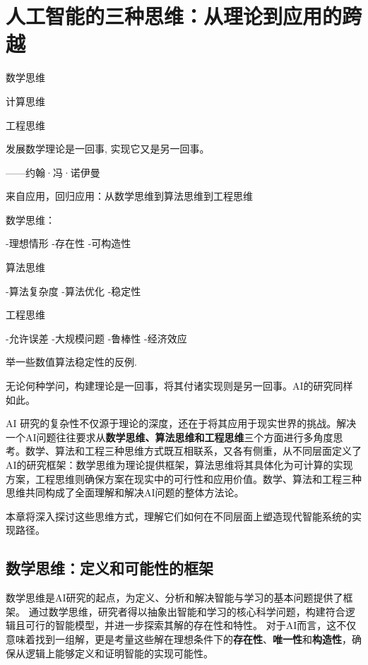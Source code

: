 \chapter{人工智能的三种思维：从理论到应用的跨越}

\begin{introduction}[本章提要]
  \item 数学思维
  \item 计算思维
  \item 工程思维
\end{introduction}

发展数学理论是一回事, 实现它又是另一回事。

\begin{flushright}
 ------约翰·冯·诺伊曼
\end{flushright}


来自应用，回归应用：从数学思维到算法思维到工程思维


数学思维：

-理想情形
-存在性
-可构造性

算法思维

-算法复杂度
-算法优化
-稳定性

工程思维

-允许误差
-大规模问题
-鲁棒性
-经济效应

举一些数值算法稳定性的反例.

无论何种学问，构建理论是一回事，将其付诸实现则是另一回事。AI的研究同样如此。 

AI 研究的复杂性不仅源于理论的深度，还在于将其应用于现实世界的挑战。解决一个AI问题往往要求从{\bf 数学思维、算法思维和工程思维}三个方面进行多角度思考。数学、算法和工程三种思维方式既互相联系，又各有侧重，从不同层面定义了AI的研究框架：数学思维为理论提供框架，算法思维将其具体化为可计算的实现方案，工程思维则确保方案在现实中的可行性和应用价值。数学、算法和工程三种思维共同构成了全面理解和解决AI问题的整体方法论。

本章将深入探讨这些思维方式，理解它们如何在不同层面上塑造现代智能系统的实现路径。

\section{数学思维：定义和可能性的框架}

数学思维是AI研究的起点，为定义、分析和解决智能与学习的基本问题提供了框架。
通过数学思维，研究者得以抽象出智能和学习的核心科学问题，构建符合逻辑且可行的智能模型，并进一步探索其解的存在性和特性。
对于AI而言，这不仅意味着找到一组解，更是考量这些解在理想条件下的{\bf 存在性}、{\bf 唯一性}和{\bf 构造性}，确保从逻辑上能够定义和证明智能的实现可能性。

